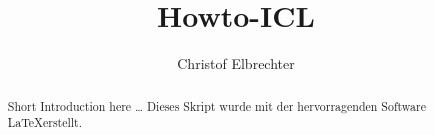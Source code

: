 \documentclass[a4paper,10pt,english]{scrreprt}
\title{Howto-ICL}
\author{Christof Elbrechter}
\begin{document}
\maketitle

\begin{abstract}
Short Introduction here \dots
Dieses Skript wurde mit der hervorragenden Software \LaTeX erstellt.

\end{abstract}

\pagebreak

\tableofcontents


\pagebreak



\end{document}
